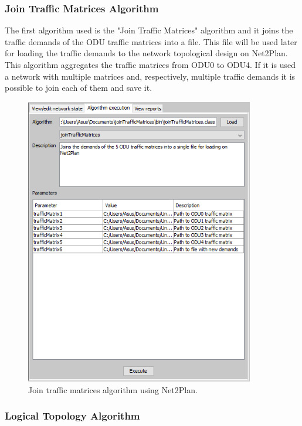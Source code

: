 \subsubsection{Join Traffic Matrices Algorithm}\label{join_traffic_matrices_algorithm}

\vspace{11pt}
The first algorithm used is the "Join Traffic Matrices" algorithm and it joins the traffic demands of the ODU traffic matrices into a file. This file will be used later for loading the traffic demands to the network topological design on Net2Plan. This algorithm aggregates the traffic matrices from ODU0 to ODU4. If it is used a network with multiple matrices and, respectively, multiple traffic demands it is possible to join each of them and save it.

\clearpage
\begin{figure}[h!]
\centering
\includegraphics[width=10cm]{sdf/heuristic/figures/join_traffic_matrices}
\caption{Join traffic matrices algorithm using Net2Plan.}
\label{join_traffic_matrices}
\end{figure}

\subsubsection{Logical Topology Algorithm}\label{logical_topology_algorithm}

